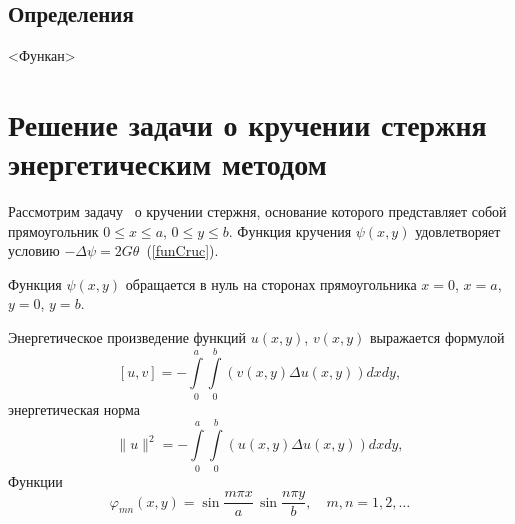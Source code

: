 \documentclass[12pt, a4paper]{article}
\begin{document}
\subsection{Определения}
<Функан>


\section{Решение задачи о кручении стержня энергетическим методом}
Рассмотрим задачу~\cite{Michilin} о кручении стержня, основание которого представляет собой   прямоугольник
$0 \leqslant x \leqslant a$, $0 \leqslant y \leqslant b$.
Функция кручения $\psi(x, y)$ удовлетворяет условию $-\Delta \psi = 2 G \theta$~(\ref{funCruc}).

Функция $\psi(x, y)$ обращается в нуль на
сторонах прямоугольника $x= 0$, $x = a$, $y = 0$, $y = b$.

Энергетическое произведение функций $u(x, y)$, $v(x, y)$ выражается формулой
\begin{equation}  
	\label{multUV}
	[\textit{u}, \textit{v}] = - \int\limits_0^a \int\limits_0^b \left(v(x, y) \Delta u(x, y ) \right) dx dy,
\end{equation}
энергетическая норма
\begin{equation}  
	\label{energoNorm}
	\|u\|^2 = - \int\limits_0^a \int\limits_0^b \left(u(x, y) \Delta u(x, y ) \right) dx dy,
\end{equation}
Функции
\begin{equation}  
	\label{phi_mn}
	\varphi_{mn}(x, y) = \sin\frac{m\pi x}{a} \, \sin\frac{n\pi y}{b}, \quad
	m, n = 1, 2, \ldots
\end{equation}
\end{document}
